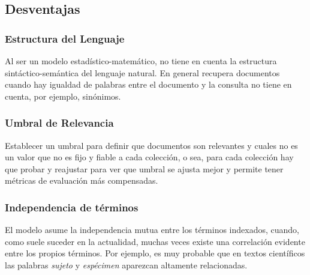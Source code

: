 \subsection{Desventajas}

\subsubsection{Estructura del Lenguaje}

Al ser un modelo estadístico-matemático, no tiene en cuenta la estructura
sintáctico-semántica del lenguaje natural. En general recupera documentos
cuando hay igualdad de palabras entre el documento y la consulta no tiene en
cuenta, por ejemplo, sinónimos.

\subsubsection{Umbral de Relevancia}

Establecer un umbral para definir que documentos son relevantes y cuales no es
un valor que no es fijo y fiable a cada colección, o sea, para cada colección
hay que probar y reajustar para ver que umbral se ajusta mejor y permite tener
métricas de evaluación más compensadas.

\subsubsection{Independencia de términos}

El modelo asume la independencia mutua entre los términos indexados, cuando,
como suele suceder en la actualidad, muchas veces existe una correlación
evidente entre los propios términos. Por ejemplo, es muy probable que en
textos científicos las palabras \emph{sujeto} y \emph{espécimen} aparezcan
altamente relacionadas.

